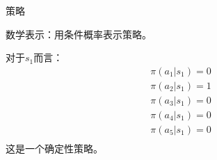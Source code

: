 \documentclass[aspectratio=169,xcolor=dvipsnames]{beamer}
\begin{document}
\begin{frame}{策略}
\begin{center}
    \end{center}
    数学表示：用条件概率表示策略。

    对于$s_1$而言：
    \[
        \begin{aligned}
            \pi(a_1|s_1) = 0 \\
            \pi(a_2|s_1) = 1 \\
            \pi(a_3|s_1) = 0 \\
            \pi(a_4|s_1) = 0 \\
            \pi(a_5|s_1) = 0 \\
        \end{aligned}
    \]
    这是一个\alert{确定性}策略。
\end{frame}
\end{document}
